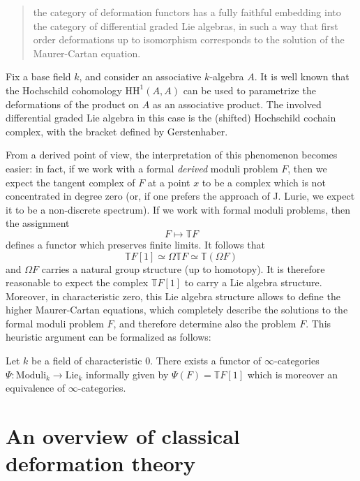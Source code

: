 \begin{refsection}
\begin{quote}
the category of deformation functors has a fully faithful embedding into the category of differential graded Lie algebras, in such a way that first order deformations up to isomorphism corresponds to the solution of the Maurer-Cartan equation.
\end{quote}

\begin{eg}
Fix a base field $k$, and consider an associative $k$-algebra $A$. It is well known that the Hochschild cohomology $\mathrm{HH}^1(A,A)$ can be used to parametrize the deformations of the product on $A$ as an associative product. The involved differential graded Lie algebra in this case is the (shifted) Hochschild cochain complex, with the bracket defined by Gerstenhaber.
\end{eg}

From a derived point of view, the interpretation of this phenomenon becomes easier: in fact, if we work with a formal \emph{derived} moduli problem $F$, then we expect the tangent complex of $F$ at a point $x$ to be a complex which is not concentrated in degree zero (or, if one prefers the approach of J. Lurie, we expect it to be a non-discrete spectrum). If we work with formal moduli problems, then the assignment
\[
F \mapsto \mathbb TF
\]
defines a functor which preserves finite limits. It follows that
\[
\mathbb TF[1] \simeq \Omega \mathbb TF \simeq \mathbb T(\Omega F)
\]
and $\Omega F$ carries a natural group structure (up to homotopy). It is therefore reasonable to expect the complex $\mathbb TF[1]$ to carry a Lie algebra structure. Moreover, in characteristic zero, this Lie algebra structure allows to define the higher Maurer-Cartan equations, which completely describe the solutions to the formal moduli problem $F$, and therefore determine also the problem $F$. This heuristic argument can be formalized as follows:

\begin{thm}
Let $k$ be a field of characteristic $0$. There exists a functor of $\infty$-categories $\Psi \colon \mathrm{Moduli}_k \to \mathrm{Lie}_k$ informally given by $\Psi(F) = \mathbb T F[1]$ which is moreover an equivalence of $\infty$-categories.
\end{thm}

\section{An overview of classical deformation theory}


\end{refsection}
